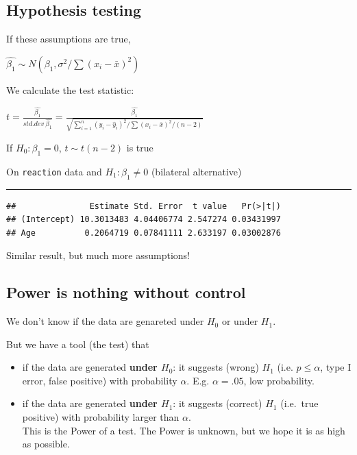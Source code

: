 \documentclass[]{article}
\newenvironment{Shaded}{\begin{snugshade}}{\end{snugshade}}
\newcommand{\KeywordTok}[1]{\textcolor[rgb]{0.13,0.29,0.53}{\textbf{#1}}}
\newcommand{\DataTypeTok}[1]{\textcolor[rgb]{0.13,0.29,0.53}{#1}}
\newcommand{\StringTok}[1]{\textcolor[rgb]{0.31,0.60,0.02}{#1}}
\newcommand{\OperatorTok}[1]{\textcolor[rgb]{0.81,0.36,0.00}{\textbf{#1}}}
\newcommand{\NormalTok}[1]{#1}
\providecommand{\tightlist}{%
  \setlength{\itemsep}{0pt}\setlength{\parskip}{0pt}}
\begin{document}
\subsection{Hypothesis testing}\label{hypothesis-testing}

If these assumptions are true,

\(\hat{\beta_1} \sim N (\beta_1, \sigma ^ 2 / \sum (x_i- \bar{x}) ^ 2)\)

We calculate the test statistic:

\(t=\frac{\hat{\beta_1}}{std.dev\ \hat{\beta_1}}=\frac{\hat{\beta_1}}{\sqrt{\sum_{i=1} ^ n (y_i- \hat{y}_i) ^ 2 / \sum (x_i- \bar{x}) ^ 2 / (n-2)}}\)

If \(H_0: \beta_1=0\), \(t \sim t (n-2)\) is true

On \texttt{reaction} data and \(H_1: \beta_1 \neq 0\) (bilateral
alternative)

\begin{center}\rule{0.5\linewidth}{\linethickness}\end{center}

\begin{Shaded}
\end{Shaded}

\begin{verbatim}
##               Estimate Std. Error  t value   Pr(>|t|)
## (Intercept) 10.3013483 4.04406774 2.547274 0.03431997
## Age          0.2064719 0.07841111 2.633197 0.03002876
\end{verbatim}

Similar result, but much more assumptions!

\subsection{Power is nothing without
control}\label{power-is-nothing-without-control}

We don't know if the data are genareted under \(H_0\) or under \(H_1\).

But we have a tool (the test) that

\begin{itemize}
\tightlist
\item
  if the data are generated \textbf{under \(H_0\)}: it suggests (wrong)
  \(H_1\) (i.e. \(p\leq \alpha\), type I error, false positive) with
  probability \(\alpha\). E.g. \(\alpha=.05\), low probability.
\item
  if the data are generated \textbf{under \(H_1\)}: it suggests
  (correct) \(H_1\) (i.e.~true positive) with probability larger than
  \(\alpha\).\\
  This is the Power of a test. The Power is unknown, but we hope it is
  as high as possible.
\end{itemize}
\end{document}
